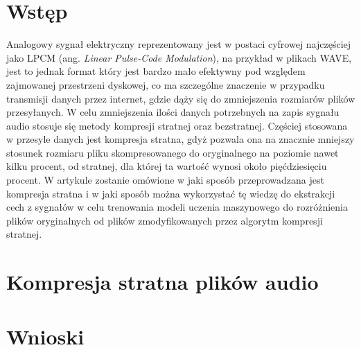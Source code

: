 \documentclass[12pt]{oska}
\affiliation{Akademia Górniczo-Hutnicza w Krakowie}
\let\Oldsection\section
\renewcommand{\section}{\FloatBarrier\Oldsection}
\begin{document}
\maketitles

\section{Wstęp}

Analogowy sygnał elektryczny reprezentowany jest w postaci cyfrowej najczęściej
jako LPCM (ang. \textit{Linear Pulse-Code Modulation}), na przykład w plikach
WAVE, jest to jednak format który jest bardzo mało efektywny pod względem
zajmowanej przestrzeni dyskowej, co ma szczególne znaczenie w przypadku
transmisji danych przez internet, gdzie dąży się do zmniejszenia rozmiarów
plików przesyłanych. W celu zmniejszenia ilości danych potrzebnych na zapis
sygnału audio stosuje się metody kompresji stratnej oraz bezstratnej. Częściej
stosowana w przesyle danych jest kompresja stratna, gdyż pozwala ona na
znacznie mniejszy stosunek rozmiaru pliku skompresowanego do oryginalnego na
poziomie nawet kilku procent, od stratnej, dla której ta wartość wynosi około
pięćdziesięciu procent. W artykule zostanie omówione w jaki sposób
przeprowadzana jest kompresja stratna i w jaki sposób można wykorzystać tę
wiedzę do ekstrakcji cech z sygnałów w celu trenowania modeli uczenia
maszynowego do rozróżnienia plików oryginalnych od plików zmodyfikowanych przez
algorytm kompresji stratnej.

\section{Kompresja stratna plików audio}

\section{Wnioski}

\printbibliography
\end{document}
